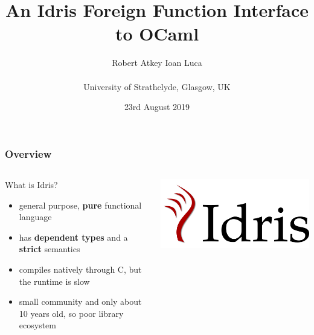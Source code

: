 \documentclass[aspectratio=169]{beamer}
\title{An Idris Foreign Function Interface to OCaml}
\author{Robert Atkey \qquad Ioan Luca\\
  \ \\
  University of Strathclyde, Glasgow, UK}
\date{23rd August 2019}
\begin{document}
\frame{\titlepage}

\newcommand{\youtem}{\quad \textcolor{titlered!80}{---} \quad}

\newcommand{\titlecard}[1]{\begin{frame}%
    \begin{center}%
      \Large \textcolor{titlered}{#1}%
    \end{center}%
  \end{frame}}

\begin{frame}[t]
  \frametitle{Overview}
  \begin{columns}[c]
    \begin{block}{What is Idris?}
      \begin{itemize}
        \item general purpose, \textbf{pure} functional language
        \item has \textbf{dependent types} and a \textbf{strict} semantics
        \item compiles natively through C, but the runtime is slow
        \item small community and only about 10 years old,
              so poor library ecosystem
      \end{itemize}
    \end{block}
    \includegraphics[width=.5\textwidth]{logo.png}
  \end{columns}
\end{frame}
\end{document}
